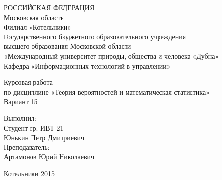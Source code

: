 \begin{titlepage}
\begin{center}
РОССИЙСКАЯ ФЕДЕРАЦИЯ\\
Московская область \\ \vspace{1cm}
Филиал «Котельники»\\
Государственного бюджетного образовательного учреждения\\
высшего образования Московской области\\
«Международный университет природы, общества и человека «Дубна»\\
Кафедра «Информационных технологий в управлении»

\vspace{2.5em}

Курсовая работа\\
по дисциплине «Теория вероятностей и математическая статистика»\\
Вариант 15


\end{center}

\vspace{6em}
 
\begin{flushright}
Выполнил:\\
Студент гр. ИВТ-21\\ 
Юнькин Петр Дмитриевич\\
Преподаватель:\\
Артамонов Юрий Николаевич

\end{flushright}

 
\vspace{\fill}

\begin{center}
Котельники 2015
\end{center}
\end{titlepage}